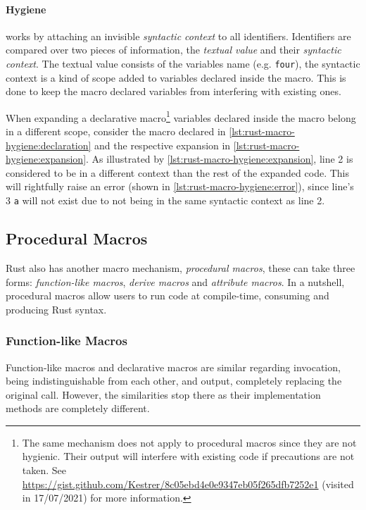\paragraph{Hygiene} works by attaching an invisible \emph{syntactic context} to all identifiers.
Identifiers are compared over two pieces of information,
the \emph{textual value} and their \emph{syntactic context}.
The textual value consists of the variables name (e.g. \texttt{four}),
the syntactic context is a kind of scope added to variables declared inside the macro.
This is done to keep the macro declared variables from interfering with existing ones.

When expanding a declarative macro\footnote{
	The same mechanism does not apply to procedural macros since they are not hygienic.
	Their output will interfere with existing code if precautions are not taken.
	See \url{https://gist.github.com/Kestrer/8c05ebd4e0e9347eb05f265dfb7252e1} (visited in 17/07/2021) for more information.}
variables declared inside the macro belong in a different scope,
consider the macro declared in \autoref{lst:rust-macro-hygiene:declaration} and
the respective expansion in \autoref{lst:rust-macro-hygiene:expansion}.
As illustrated by \autoref{lst:rust-macro-hygiene:expansion},
line 2 is considered to be in a different context than the rest of the expanded code.
This will rightfully raise an error (shown in \autoref{lst:rust-macro-hygiene:error}),
since line's 3 \texttt{a} will not exist due to not being in the same syntactic context as line 2.










\subsection{Procedural Macros}\label{sec:rust-macros:proc}
Rust also has another macro mechanism, \emph{procedural macros},
these can take three forms: \emph{function-like macros}, \emph{derive macros} and \emph{attribute macros}.
In a nutshell, procedural macros allow users to run code at compile-time, consuming and producing Rust syntax.

\subsubsection*{Function-like Macros}
Function-like macros and declarative macros are similar regarding invocation, being indistinguishable from each other,
and output, completely replacing the original call.
However, the similarities stop there as their implementation methods are completely different.

